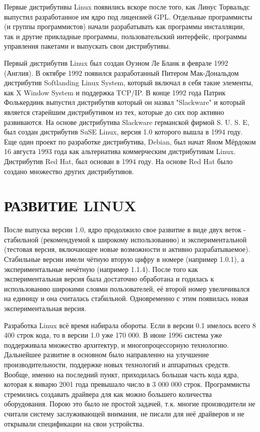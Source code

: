 \documentclass[bachelor, och, referat, times]{SCWorks}
\begin{document}
\par Первые дистрибутивы Linux появились вскоре после того, как Линус
Торвальдс выпустил разработанное им ядро под лицензией GPL. Отдельные 
программисты (и группы программистов) начали разрабатывать как программы 
инсталляции, так и другие прикладные программы, пользовательский 
интерфейс, программы управления пакетами и выпускать свои дистрибутивы.

\par Первый дистрибутив Linux был создан Оуэном Ле Бланк в феврале 1992 
(Англия). В октябре 1992 появился разработанный Питером Мак-Дональдом 
дистрибутив Softlanding Linux System, который включал в себя такие 
элементы, как X Window System и поддержка TCP/IP. В конце 1992 года Патрик
Фолькердинк выпустил дистрибутив который он назвал "Slackware" и который 
является старейшим дистрибутивом из тех, которые до сих пор активно 
развиваются. На основе дистрибутива Slackware германской фирмой S. U. S. 
E, был создан дистрибутив SuSE Linux, версия 1.0 которого вышла в 1994 
году. Еще один проект по разработке дистрибутива, Debian, был начат Яном 
Мёрдоком 16 августа 1993 года как альтернатива коммерческим дистрибутивам 
Linux. Дистрибутив Red Hat, был основан в 1994 году. На основе Red Hat 
было создано множество других дистрибутивов.

\section{РАЗВИТИЕ LINUX}

\par После выпуска версии 1.0, ядро продолжило свое развитие в виде двух 
веток - стабильной (рекомендуемой к широкому использованию) и 
экспериментальной (тестовая версия, включающее новые возможности и активно
разрабатываемое). Стабильные версии имели чётную вторую цифру в номере 
(например 1.0.1), а экспериментальные нечётную (например 1.1.4). После 
того как экспериментальная версия была достаточно обработана и годилась к 
использованию широкими слоями пользователей, её второй номер увеличивался 
на единицу и она считалась стабильной. Одновременно с этим появилась новая
экспериментальная версия.

\par Разработка Linux всё время набирала обороты. Если в версии 0.1 
имелось всего 8 400 строк кода, то в версии 1.0 уже 170 000. В июне 1996 
система уже поддерживала множество архитектур, и многопроцессорную 
технологию. Дальнейшее развитие в основном было направленно на улучшение 
производительности, поддержке новых технологий и аппаратных средств. 
Вообще, именно на последний пункт, приходилась большая часть кода ядра, 
которая к январю 2001 года превышало число в 3 000 000 строк. Программисты
стремились создавать драйвера для как можно большего количества 
оборудования. Порою это было не простой задачей, т.к. многие производители
не считали систему заслуживающей внимания, не писали для неё драйверов и 
не открывали спецификации на свои устройства.
\end{document}
